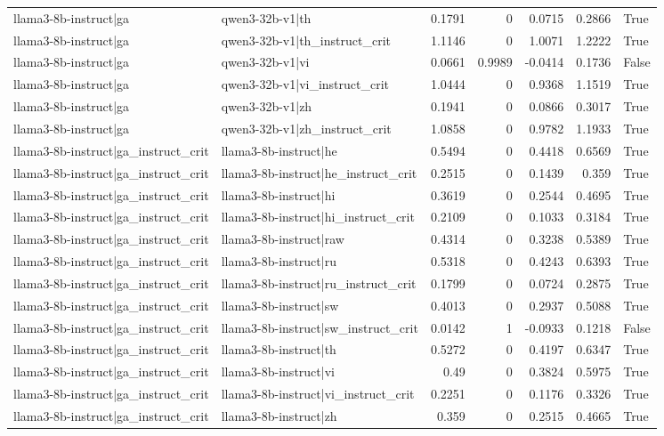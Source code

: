 \begin{table}
\begin{tabular}{l l r r r r l}
llama3-8b-instruct|ga & qwen3-32b-v1|th & 0.1791 & 0 & 0.0715 & 0.2866 & True \\
llama3-8b-instruct|ga & qwen3-32b-v1|th_instruct_crit & 1.1146 & 0 & 1.0071 & 1.2222 & True \\
llama3-8b-instruct|ga & qwen3-32b-v1|vi & 0.0661 & 0.9989 & -0.0414 & 0.1736 & False \\
llama3-8b-instruct|ga & qwen3-32b-v1|vi_instruct_crit & 1.0444 & 0 & 0.9368 & 1.1519 & True \\
llama3-8b-instruct|ga & qwen3-32b-v1|zh & 0.1941 & 0 & 0.0866 & 0.3017 & True \\
llama3-8b-instruct|ga & qwen3-32b-v1|zh_instruct_crit & 1.0858 & 0 & 0.9782 & 1.1933 & True \\
llama3-8b-instruct|ga_instruct_crit & llama3-8b-instruct|he & 0.5494 & 0 & 0.4418 & 0.6569 & True \\
llama3-8b-instruct|ga_instruct_crit & llama3-8b-instruct|he_instruct_crit & 0.2515 & 0 & 0.1439 & 0.359 & True \\
llama3-8b-instruct|ga_instruct_crit & llama3-8b-instruct|hi & 0.3619 & 0 & 0.2544 & 0.4695 & True \\
llama3-8b-instruct|ga_instruct_crit & llama3-8b-instruct|hi_instruct_crit & 0.2109 & 0 & 0.1033 & 0.3184 & True \\
llama3-8b-instruct|ga_instruct_crit & llama3-8b-instruct|raw & 0.4314 & 0 & 0.3238 & 0.5389 & True \\
llama3-8b-instruct|ga_instruct_crit & llama3-8b-instruct|ru & 0.5318 & 0 & 0.4243 & 0.6393 & True \\
llama3-8b-instruct|ga_instruct_crit & llama3-8b-instruct|ru_instruct_crit & 0.1799 & 0 & 0.0724 & 0.2875 & True \\
llama3-8b-instruct|ga_instruct_crit & llama3-8b-instruct|sw & 0.4013 & 0 & 0.2937 & 0.5088 & True \\
llama3-8b-instruct|ga_instruct_crit & llama3-8b-instruct|sw_instruct_crit & 0.0142 & 1 & -0.0933 & 0.1218 & False \\
llama3-8b-instruct|ga_instruct_crit & llama3-8b-instruct|th & 0.5272 & 0 & 0.4197 & 0.6347 & True \\
llama3-8b-instruct|ga_instruct_crit & llama3-8b-instruct|vi & 0.49 & 0 & 0.3824 & 0.5975 & True \\
llama3-8b-instruct|ga_instruct_crit & llama3-8b-instruct|vi_instruct_crit & 0.2251 & 0 & 0.1176 & 0.3326 & True \\
llama3-8b-instruct|ga_instruct_crit & llama3-8b-instruct|zh & 0.359 & 0 & 0.2515 & 0.4665 & True \\

\end{tabular}
\end{table}
